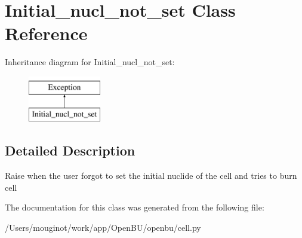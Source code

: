 \hypertarget{classopenbu_1_1cell_1_1_initial__nucl__not__set}{}\section{Initial\+\_\+nucl\+\_\+not\+\_\+set Class Reference}
\label{classopenbu_1_1cell_1_1_initial__nucl__not__set}
Inheritance diagram for Initial\+\_\+nucl\+\_\+not\+\_\+set\+:\begin{figure}[H]
\begin{center}
\leavevmode
\includegraphics[height=2.000000cm]{classopenbu_1_1cell_1_1_initial__nucl__not__set}
\end{center}
\end{figure}


\subsection{Detailed Description}
\begin{DoxyVerb}Raise when the user forgot to set the initial nuclide of the cell and tries to burn cell\end{DoxyVerb}
 

The documentation for this class was generated from the following file\+:\begin{DoxyCompactItemize}
\item 
/\+Users/mouginot/work/app/\+Open\+B\+U/openbu/cell.\+py\end{DoxyCompactItemize}
